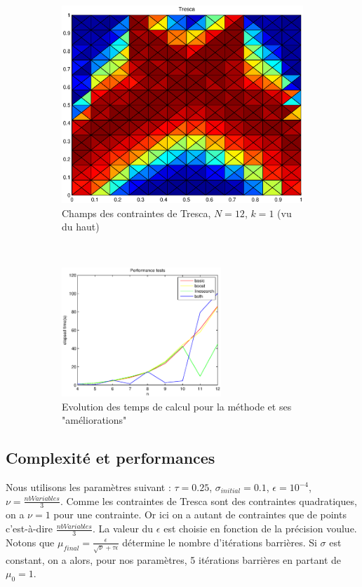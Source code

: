\begin{figure}[h!]
\begin{subfigure}[b]{0.32\textwidth}
  \includegraphics[width=\textwidth]{images/TrescaUp.eps}
  \caption{Champs des contraintes de Tresca, $N=12$, $k=1$ (vu du haut)}
    \label{fig:TrescaUp}
  \end{subfigure}
  ~
  \begin{subfigure}[b]{0.32\textwidth}
  \includegraphics[width=6cm]{images/speedimp.eps}
\caption{Evolution des temps de calcul pour la méthode et ses "améliorations"\label{fig:speedimp}}
  \end{subfigure}
  \caption{}
  \label{fig:ResultatsChampsSigma}
\end{figure}

\subsection{Complexité et performances}
Nous utilisons les paramètres suivant : $\tau = 0.25$, $\sigma_{initial} = 0.1$, $\epsilon = 10^{-4}$, $\nu = \frac{nbVariables}{3}$. Comme les contraintes de Tresca sont des contraintes quadratiques, on a $\nu=1$ pour une contrainte. Or ici on a autant de contraintes que de points c'est-à-dire $\frac{nbVariables}{3}$. La valeur du $\epsilon$ est choisie en fonction de la précision voulue. Notons que $\mu_{final} = \frac{\epsilon}{\sqrt{\nu} + \tau \epsilon}$ détermine le nombre d'itérations barrières. Si $\sigma$ est constant, on a alors, pour nos paramètres, 5 itérations barrières en partant de $\mu_0=1$. 

